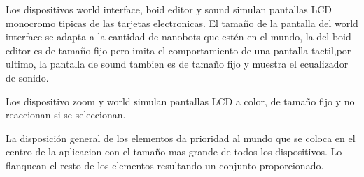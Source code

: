 Los dispositivos world interface, boid editor y sound  simulan pantallas LCD monocromo tipicas de las tarjetas electronicas. El tamaño de la pantalla del world interface se adapta a la cantidad de nanobots que estén en el mundo, la del boid editor es de tamaño fijo pero imita el comportamiento de una pantalla tactil,por ultimo, la pantalla de sound tambien es de tamaño fijo y muestra el ecualizador de sonido.

Los dispositivo zoom y world simulan pantallas LCD a color, de tamaño fijo y no reaccionan si se seleccionan. 

La disposición general de los elementos da prioridad al mundo que se coloca en el centro de la aplicacion con el tamaño mas grande de todos los dispositivos. Lo flanquean el resto de los elementos resultando un conjunto proporcionado.